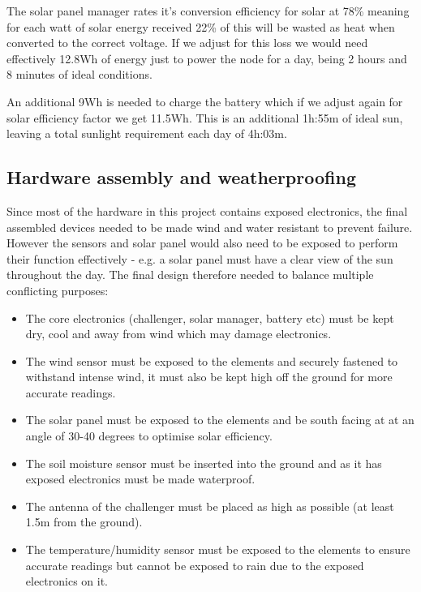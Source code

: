 The solar panel manager rates it's conversion efficiency for solar at 78\%
meaning for each watt of solar energy received 22\% of this will be wasted as
heat when converted to the correct voltage. If we adjust for this loss we would
need effectively 12.8Wh of energy just to power the node for a day, being 2
hours and 8 minutes of ideal conditions.

An additional 9Wh is needed to charge the battery which if we adjust again for
solar efficiency factor we get 11.5Wh. This is an additional 1h:55m of ideal
sun, leaving a total sunlight requirement each day of 4h:03m.

\subsection{Hardware assembly and weatherproofing}

Since most of the hardware in this project contains exposed electronics, the
final assembled devices needed to be made wind and water resistant to prevent
failure. However the sensors and solar panel would also need to be exposed to
perform their function effectively - e.g. a solar panel must have a clear view
of the sun throughout the day. The final design therefore needed to balance
multiple conflicting purposes:

\begin{itemize}
    \item The core electronics (challenger, solar manager, battery etc) must be
          kept dry, cool and away from wind which may damage electronics.
    \item The wind sensor must be exposed to the elements and securely fastened
          to withstand intense wind, it must also be kept high off the ground
          for more accurate readings.
    \item The solar panel must be exposed to the elements and be south facing at
          at an angle of 30-40 degrees to optimise solar efficiency.
    \item The soil moisture sensor must be inserted into the ground and as it
          has exposed electronics must be made waterproof.
    \item The antenna of the challenger must be placed as high as possible (at
          least 1.5m from the ground).
    \item The temperature/humidity sensor must be exposed to the elements to
          ensure accurate readings but cannot be exposed to rain due to the
          exposed electronics on it.
\end{itemize}

